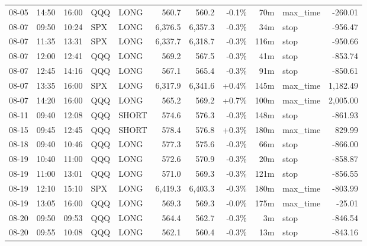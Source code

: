 \documentclass[11pt,a4paper,twoside]{article}
\begin{document}
\begin{center}
\begin{longtable}{>{\color{txtmain}}l l l l l r r r r >{\color{txtmain}}l r}
08-05 & 14:50 & 16:00 & QQQ & LONG & 560.7 & 560.2 & \textcolor{lossred}{-0.1\%} & 70m & max\_time & \textcolor{lossred}{-260.01} \\
08-07 & 09:50 & 10:24 & SPX & LONG & 6,376.5 & 6,357.3 & \textcolor{lossred}{-0.3\%} & 34m & stop & \textcolor{lossred}{-956.47} \\
08-07 & 11:35 & 13:31 & SPX & LONG & 6,337.7 & 6,318.7 & \textcolor{lossred}{-0.3\%} & 116m & stop & \textcolor{lossred}{-950.66} \\
08-07 & 12:00 & 12:41 & QQQ & LONG & 569.2 & 567.5 & \textcolor{lossred}{-0.3\%} & 41m & stop & \textcolor{lossred}{-853.74} \\
08-07 & 12:45 & 14:16 & QQQ & LONG & 567.1 & 565.4 & \textcolor{lossred}{-0.3\%} & 91m & stop & \textcolor{lossred}{-850.61} \\
08-07 & 13:35 & 16:00 & SPX & LONG & 6,317.9 & 6,341.6 & \textcolor{wingreen}{+0.4\%} & 145m & max\_time & \textcolor{wingreen}{1,182.49} \\
08-07 & 14:20 & 16:00 & QQQ & LONG & 565.2 & 569.2 & \textcolor{wingreen}{+0.7\%} & 100m & max\_time & \textcolor{wingreen}{2,005.00} \\
08-11 & 09:40 & 12:08 & QQQ & SHORT & 574.6 & 576.3 & \textcolor{lossred}{-0.3\%} & 148m & stop & \textcolor{lossred}{-861.93} \\
08-15 & 09:45 & 12:45 & QQQ & SHORT & 578.4 & 576.8 & \textcolor{wingreen}{+0.3\%} & 180m & max\_time & \textcolor{wingreen}{829.99} \\
08-18 & 09:40 & 10:46 & QQQ & LONG & 577.3 & 575.6 & \textcolor{lossred}{-0.3\%} & 66m & stop & \textcolor{lossred}{-866.00} \\
08-19 & 10:40 & 11:00 & QQQ & LONG & 572.6 & 570.9 & \textcolor{lossred}{-0.3\%} & 20m & stop & \textcolor{lossred}{-858.87} \\
08-19 & 11:00 & 13:01 & QQQ & LONG & 571.0 & 569.3 & \textcolor{lossred}{-0.3\%} & 121m & stop & \textcolor{lossred}{-856.55} \\
08-19 & 12:10 & 15:10 & SPX & LONG & 6,419.3 & 6,403.3 & \textcolor{lossred}{-0.3\%} & 180m & max\_time & \textcolor{lossred}{-803.99} \\
08-19 & 13:05 & 16:00 & QQQ & LONG & 569.3 & 569.3 & \textcolor{lossred}{-0.0\%} & 175m & max\_time & \textcolor{lossred}{-25.01} \\
08-20 & 09:50 & 09:53 & QQQ & LONG & 564.4 & 562.7 & \textcolor{lossred}{-0.3\%} & 3m & stop & \textcolor{lossred}{-846.54} \\
08-20 & 09:55 & 10:08 & QQQ & LONG & 562.1 & 560.4 & \textcolor{lossred}{-0.3\%} & 13m & stop & \textcolor{lossred}{-843.16} \\

\end{longtable}
\end{center}
\end{document}
